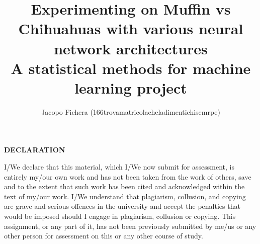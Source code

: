 \documentclass[a4paper]{article}
\title{Experimenting on Muffin vs Chihuahuas with various neural network architectures \\
\large A statistical methods for machine learning project }
\author{Jacopo Fichera (166trovamatricolacheladimentichisemrpe)}
\begin{document}
    \maketitle

    \leavevmode%
    \vfill\noindent
    \begin{center}
        \textbf{DECLARATION}
    \end{center}
    I/We declare that this material, which I/We now submit for assessment, is entirely my/our own work and has not been taken from the work of others, save and to the extent that such work has been cited and acknowledged within the text of my/our work. I/We understand that plagiarism, collusion, and copying are grave and serious offences in the university and accept the penalties that would be imposed should I engage in plagiarism, collusion or copying. This assignment, or any part of it, has not been previously submitted by me/us or any other person for assessment on this or any other course of study.
    \newpage
    \tableofcontents

    
    
    
    
    
    
    
    \newpage
    
\end{document}
